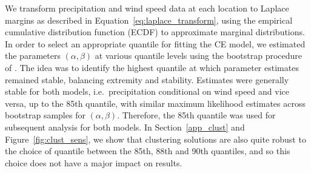 \documentclass[
  12pt]{article}
\DeclareMathOperator{\CE}{\mathrm{CE}}
\begin{document}
We transform precipitation and wind speed data at each location to Laplace margins as described in Equation~\eqref{eq:laplace_transform}, using the empirical cumulative distribution function (ECDF) to approximate marginal distributions.  
In order to select an appropriate quantile for fitting the CE model, we estimated the parameters $(\alpha, \beta)$ at various quantile levels using the bootstrap procedure of \citet{Heffernan2004}. 
The idea was to identify the highest quantile at which parameter estimates remained stable, balancing extremity and stability.
Estimates were generally stable for both models, i.e.\ precipitation conditional on wind speed and vice versa, up to the 85th quantile, with similar maximum likelihood estimates across bootstrap samples for $(\alpha, \beta)$. %
Therefore, the 85th quantile was used for subsequent analysis for both models.
In Section~\ref{app_clust} and Figure~\ref{fig:clust_sens}, we show that clustering solutions are also quite robust to the choice of quantile between the 85th, 88th and 90th quantiles, and so this choice does not have a major impact on results.
\end{document}
